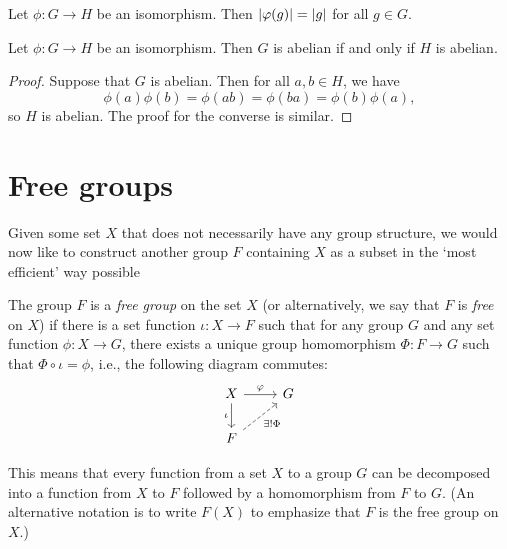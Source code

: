 \begin{theorem}
    Let \(\phi: G \to H\) be an isomorphism. Then \(\lvert \varphi(g) \rvert =
    \lvert g \rvert\) for all \(g \in G\).
\end{theorem}

\begin{theorem}
    Let \(\phi : G \to H\) be an isomorphism. Then \(G\) is abelian if and only
    if \(H\) is abelian.
\end{theorem}

\begin{proof}
    Suppose that \(G\) is abelian. Then for all \(a, b \in H\), we have
    \[
        \phi(a)\phi(b) = \phi(ab) = \phi(ba) = \phi(b)\phi(a),
    \]
    so \(H\) is abelian. The proof for the converse is similar.
\end{proof}

\section{Free groups}

Given some set \(X\) that does not necessarily have any group structure, we
would now like to construct another group \(F\) containing \(X\) as a subset in
the `most efficient' way possible

\begin{definition}
    The group \(F\) is a \emph{free group} on the set \(X\) (or alternatively,
    we say that \(F\) is \emph{free} on \(X\)) if there is a set function
    \(\iota: X \to F\) such that for any group \(G\) and any set function
    \(\phi: X \to G\), there exists a unique group homomorphism \(\Phi: F \to
    G\) such that \(\Phi \circ \iota = \phi\), i.e., the following diagram
    commutes:
    \[
        \begin{tikzcd}
            X \arrow[d, "\iota"'] \arrow[r, "\phi"] & G \\
            F \arrow[ru, "\exists!\Phi"', dashed]        &  
        \end{tikzcd}
    \]
\end{definition}

This means that every function from a set \(X\) to a group \(G\) can be
decomposed into a function from \(X\) to \(F\) followed by a homomorphism from
\(F\) to \(G\). (An alternative notation is to write \(F(X)\) to emphasize that
\(F\) is the free group on \(X\).)

